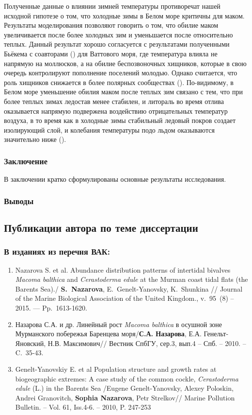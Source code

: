 {Полученные данные о влиянии зимней температуры противоречат нашей исходной гипотезе о том, что холодные зимы в Белом море критичны для маком. 
Результаты моделирования позволяют говорить о том, что обилие маком увеличивается после более холодных зим и уменьшается после относительно теплых. 
Данный результат хорошо согласуется с результатами полученными Бьёкема с соавторами (\cite{Beukema_et_al_1998, Beukema_et_al_2009}) для Ваттового моря, где температура влияла не напрямую на моллюсков, а на обилие беспозвоночных хищников, которые в свою очередь контролируют пополнение поселений молодью.  
Однако считается, что роль хищников снижается в более полярных сообществах (\cite{Pianka_1966, Freestone_et_al_2011}). 
По-видимому, в Белом море уменьшение обилия маком после теплых зим связано с тем, что при более теплых зимах ледостав менее стабилен, и литораль во время отлива оказывается напрямую подвержена воздействию отрицательных температур воздуха, в то время как в холодные зимы стабильный ледовый покров создает изолирующий слой, и колебания температуры подо льдом оказываются значительно ниже (\cite{Kuznecov_1960}).
\subsubsection*{Заключение}
В заключении кратко сформулированы основные результаты исследования.

\subsubsection*{Выводы}


\begin{small}
\subsection*{Публикации автора по теме диссертации}
\subsubsection*{В изданиях из перечня ВАК:}
\begin{enumerate}
\item  Nazarova S. et al. Abundance distribution patterns of intertidal bivalves \textit{Macoma balthica} and \textit{Cerastoderma edule} at the Murman coast tidal flats (the Barents Sea)./ \textbf{S.~Nazarova}, E.~Genelt-Yanovsky, K.~Shunkina // Journal of the Marine Biological Association of the United Kingdom., v.~95~(8) -- 2015. — Pp.~1613-1620.
\item Назарова С.А. и др. Линейный рост \textit{Macoma balthica} в осушной зоне Мурманского побережья Баренцева моря/\textbf{С.А. Назарова}, Е.А.  Генельт-Яновский,  Н.В. Максимович// Вестник СпбГУ, сер.3, вып.4 -- Спб. -- 2010. -- C.~35-43.
\item Genelt-Yanovskiy E. et al Population structure and growth rates at biogeographic extremes: A case study of the common cockle, \textit{Cerastoderma edule} (L.) in the Barents Sea /Eugene Genelt-Yanovsky, Alexey Poloskin, Andrei Granovitch, \textbf{Sophia Nazarova}, Petr Strelkov// Marine Pollution Bulletin. -- Vol. 61, Iss.4-6. -- 2010, P. 247-253 
\end{enumerate}


\end{small}}
